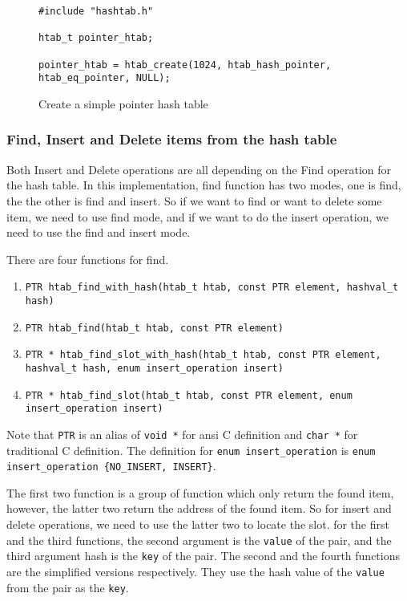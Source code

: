 \documentclass[11pt]{article}
\begin{document}
\begin{figure}
\begin{lstlisting}
#include "hashtab.h"

htab_t pointer_htab;

pointer_htab = htab_create(1024, htab_hash_pointer, htab_eq_pointer, NULL);
\end{lstlisting}
\caption{Create a simple pointer hash table}
\label{fig:create-pointer-hash-table}
\end{figure}

\subsubsection{Find, Insert and Delete items from the hash table}
Both Insert and Delete operations are all depending on the Find operation for the hash table. In this implementation, find function has two modes, one is find, the the other is find and insert. So if we want to find or want to delete some item, we need to use find mode, and if we want to do the insert operation, we need to use the find and insert mode.

There are four functions for find.
\begin{enumerate}
\item \texttt{PTR htab\_find\_with\_hash(htab\_t htab, const PTR element, hashval\_t hash)}
\item \texttt{PTR htab\_find(htab\_t htab, const PTR element)}
\item \texttt{PTR * htab\_find\_slot\_with\_hash(htab\_t htab, const PTR element, hashval\_t hash, enum insert\_operation insert)}
\item \texttt{PTR * htab\_find\_slot(htab\_t htab, const PTR element, enum insert\_operation insert)}
\end{enumerate}

Note that \texttt{PTR} is an alias of \texttt{void *} for ansi C definition and \texttt{char *} for traditional C definition. The definition for \texttt{enum insert\_operation} is \texttt{enum insert\_operation \{NO\_INSERT, INSERT\}}.


The first two function is a group of function which only return the found item, however, the latter two return the address of the found item. So for insert and delete operations, we need to use the latter two to locate the slot. for the first and the third functions, the second argument is the \texttt{value} of the pair, and the third argument hash is the \texttt{key} of the pair. The second and the fourth functions are the simplified versions respectively. They use the hash value of the \texttt{value} from the pair as the \texttt{key}.
\end{document}
